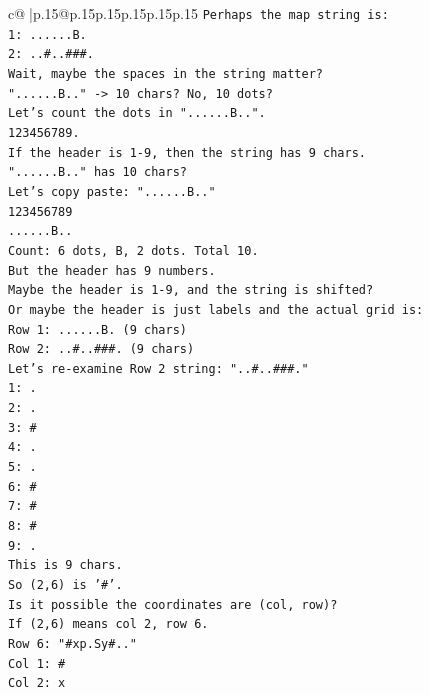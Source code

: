 \documentclass{article}
\begin{document}
{\begin{supertabular}{c@{$\;$}|p{.15\linewidth}@{}p{.15\linewidth}p{.15\linewidth}p{.15\linewidth}p{.15\linewidth}p{.15\linewidth}}
{{{\texttt{Perhaps the map string is:} \\
\texttt{1: ......B.} \\
\texttt{2: ..\#..\#\#\#.} \\
\texttt{Wait, maybe the spaces in the string matter?} \\
\texttt{"......B.." {-}> 10 chars? No, 10 dots?} \\
\texttt{Let's count the dots in "......B..".} \\
\texttt{123456789.} \\
\texttt{If the header is 1{-}9, then the string has 9 chars.} \\
\texttt{"......B.." has 10 chars?} \\
\texttt{Let's copy paste: "......B.."} \\
\texttt{123456789} \\
\texttt{......B..} \\
\texttt{Count: 6 dots, B, 2 dots. Total 10.} \\
\texttt{But the header has 9 numbers.} \\
\texttt{Maybe the header is 1{-}9, and the string is shifted?} \\
\texttt{Or maybe the header is just labels and the actual grid is:} \\
\texttt{Row 1: ......B. (9 chars)} \\
\texttt{Row 2: ..\#..\#\#\#. (9 chars)} \\
\texttt{Let's re{-}examine Row 2 string: "..\#..\#\#\#."} \\
\texttt{1: .} \\
\texttt{2: .} \\
\texttt{3: \#} \\
\texttt{4: .} \\
\texttt{5: .} \\
\texttt{6: \#} \\
\texttt{7: \#} \\
\texttt{8: \#} \\
\texttt{9: .} \\
\texttt{This is 9 chars.} \\
\texttt{So (2,6) is '\#'.} \\
\texttt{Is it possible the coordinates are (col, row)?} \\
\texttt{If (2,6) means col 2, row 6.} \\
\texttt{Row 6: "\#xp.Sy\#.."} \\
\texttt{Col 1: \#} \\
\texttt{Col 2: x} \\
}}}
\end{supertabular}}
\end{document}
